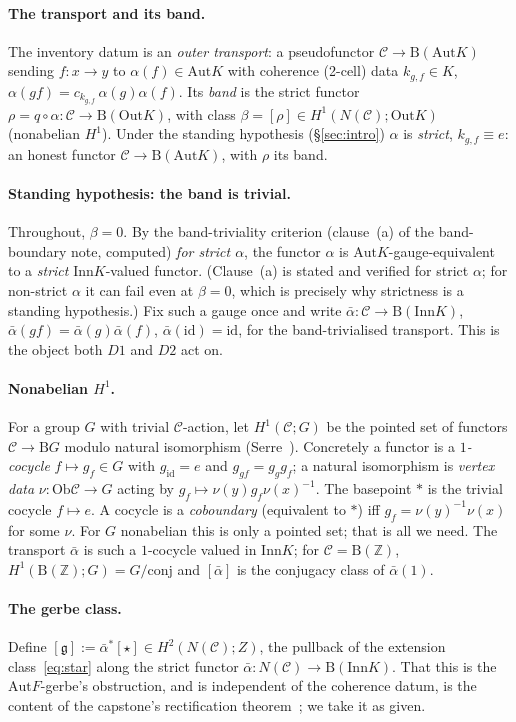 \documentclass[11pt]{article}
\theoremstyle{definition}
\newcommand{\C}{\mathcal{C}}
\newcommand{\Ob}{\mathrm{Ob}}
\newcommand{\id}{\mathrm{id}}
\newcommand{\Z}{\mathbb{Z}}
\newcommand{\Aut}{\mathrm{Aut}}
\newcommand{\Inn}{\mathrm{Inn}}
\newcommand{\Out}{\mathrm{Out}}
\newcommand{\gerbe}{\mathfrak{g}}
\newcommand{\abar}{\bar{\alpha}}
\newcommand{\B}{\mathrm{B}}
\begin{document}
\paragraph{The transport and its band.} The inventory datum is an \emph{outer transport}:
a pseudofunctor $\C\to\B(\Aut K)$ sending $f\colon x\to y$ to $\alpha(f)\in\Aut K$ with
coherence (2-cell) data $k_{g,f}\in K$, $\alpha(gf)=c_{k_{g,f}}\,\alpha(g)\alpha(f)$. Its
\emph{band} is the strict functor $\rho=q\circ\alpha\colon\C\to\B(\Out K)$, with class
$\beta=[\rho]\in H^1(N(\C);\Out K)$ (nonabelian $H^1$). Under the standing hypothesis
(\S\ref{sec:intro}) $\alpha$ is \emph{strict}, $k_{g,f}\equiv e$: an honest functor
$\C\to\B(\Aut K)$, with $\rho$ its band.

\paragraph{Standing hypothesis: the band is trivial.} Throughout, $\beta=0$. By the
band-triviality criterion (clause~(a) of the band-boundary note, computed) \emph{for strict
$\alpha$}, the functor $\alpha$ is $\Aut K$-gauge-equivalent to a \emph{strict} $\Inn
K$-valued functor. (Clause~(a) is stated and verified for strict $\alpha$; for non-strict
$\alpha$ it can fail even at $\beta=0$, which is precisely why strictness is a standing
hypothesis.) Fix such a gauge once and write $\abar\colon\C\to\B(\Inn K)$,
$\abar(gf)=\abar(g)\abar(f)$, $\abar(\id)=\id$, for the band-trivialised transport. This is
the object both $D1$ and $D2$ act on.

\paragraph{Nonabelian $H^1$.} For a group $G$ with trivial $\C$-action, let
$H^1(\C;G)$ be the pointed set of functors $\C\to\B G$ modulo natural isomorphism
(Serre~\cite[I.5]{serre}). Concretely a functor is a \emph{$1$-cocycle} $f\mapsto g_f\in G$
with $g_{\id}=e$ and $g_{gf}=g_g g_f$; a natural isomorphism is \emph{vertex data}
$\nu\colon\Ob\C\to G$ acting by $g_f\mapsto\nu(y)g_f\nu(x)^{-1}$. The basepoint $*$ is the
trivial cocycle $f\mapsto e$. A cocycle is a \emph{coboundary} (equivalent to $*$) iff
$g_f=\nu(y)^{-1}\nu(x)$ for some $\nu$. For $G$ nonabelian this is only a pointed set; that
is all we need. The transport $\abar$ is such a $1$-cocycle valued in $\Inn K$; for
$\C=\B(\Z)$, $H^1(\B(\Z);G)=G/\mathrm{conj}$ and $[\abar]$ is the conjugacy class of
$\abar(1)$.

\paragraph{The gerbe class.} Define $[\gerbe]:=\abar^{*}[\star]\in H^2(N(\C);Z)$, the
pullback of the extension class~\eqref{eq:star} along the strict functor
$\abar\colon N(\C)\to\B(\Inn K)$. That this is the $\Aut F$-gerbe's obstruction, and is
independent of the coherence datum, is the content of the capstone's rectification
theorem~\cite{macbeth-capstone}; we take it as given.
\end{document}
